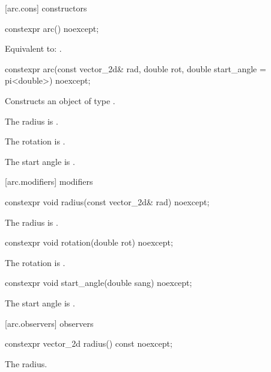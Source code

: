  [arc.cons] { constructors}%

%
\begin{itemdecl}
constexpr arc() noexcept;
\end{itemdecl}
\begin{itemdescr}
\pnum
\effects
Equivalent to: .
\end{itemdescr}

%
\begin{itemdecl}
constexpr arc(const vector_2d& rad, double rot,
  double start_angle = pi<double>) noexcept;
\end{itemdecl}
\begin{itemdescr}
\pnum
\effects
Constructs an object of type .

\pnum
The radius is .

\pnum
The rotation is .

\pnum
The start angle is .
\end{itemdescr}

 [arc.modifiers]{ modifiers}%

%
\begin{itemdecl}
constexpr void radius(const vector_2d& rad) noexcept;
\end{itemdecl}
\begin{itemdescr}
\pnum
\effects
The radius is .
\end{itemdescr}

%
\begin{itemdecl}
constexpr void rotation(double rot) noexcept;
\end{itemdecl}
\begin{itemdescr}
\pnum
\effects
The rotation is .
\end{itemdescr}

%
\begin{itemdecl}
constexpr void start_angle(double sang) noexcept;
\end{itemdecl}
\begin{itemdescr}
\pnum
\effects
The start angle is .
\end{itemdescr}

 [arc.observers]{ observers}%

%
\begin{itemdecl}
constexpr vector_2d radius() const noexcept;
\end{itemdecl}
\begin{itemdescr}
\pnum
\returns
The radius.
\end{itemdescr}

